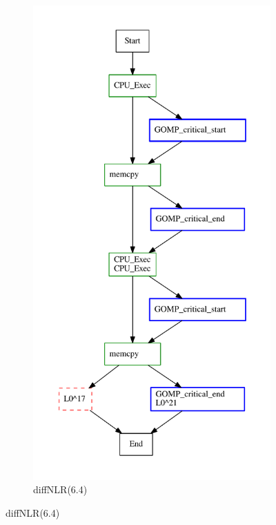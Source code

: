 \begin{figure}[t]
     \centering
     \begin{subfigure}[b]{0.31\textwidth}
        \centering
\includegraphics[width=\textwidth]{diffTrace/figs/diffNLR/ompBug-6-4-x0.pdf}
\caption{diffNLR(6.4)}

\end{subfigure}
\end{figure}
